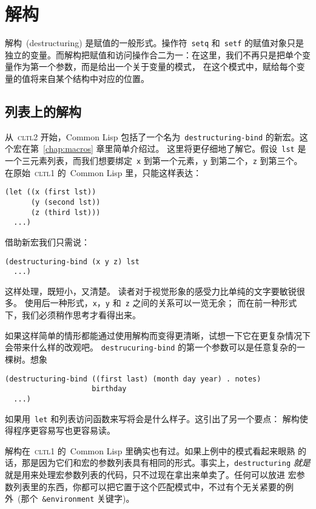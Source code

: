 
\chapter{解构}
\label{chap:destructuring}

解构~(destructuring) 是赋值的一般形式。操作符~\texttt{setq} 和~\texttt{setf} 的赋值对象只是
独立的变量。而解构把赋值和访问操作合二为一：在这里，我们不再只是把单个变量作为第一个参数，而是给出一个关于变量的模式，
在这个模式中，赋给每个变量的值将来自某个结构中对应的位置。

\section{列表上的解构}
\label{destructuring_on_lists}

从~\textsc{cltl}2 开始，Common Lisp 包括了一个名为~\texttt{destructuring-bind}
的新宏。这个宏在第~\ref{chap:macros} 章里简单介绍过。
这里将更仔细地了解它。假设~\texttt{lst} 是一个三元素列表，而我们想要绑定~\texttt{x}
到第一个元素，\texttt{y} 到第二个，\texttt{z} 到第三个。在原始~\textsc{cltl}1
的~Common Lisp 里，只能这样表达：
\begin{lstlisting}
(let ((x (first lst))
      (y (second lst))
      (z (third lst)))
  ...)
\end{lstlisting}
借助新宏我们只需说：
\begin{lstlisting}
(destructuring-bind (x y z) lst
  ...)
\end{lstlisting}
这样处理，既短小，又清楚。
读者对于视觉形象的感受力比单纯的文字要敏锐很多。
使用后一种形式，\texttt{x}，\texttt{y} 和~\texttt{z} 之间的关系可以一览无余；
而在前一种形式下，我们必须稍作思考才看得出来。

如果这样简单的情形都能通过使用解构而变得更清晰，试想一下它在更复杂情况下会带来什么样的改观吧。
\texttt{destrucuring-bind} 的第一个参数可以是任意复杂的一棵树。想象
\begin{lstlisting}
(destructuring-bind ((first last) (month day year) . notes)
                    birthday
  ...)
\end{lstlisting}
如果用~\texttt{let} 和列表访问函数来写将会是什么样子。这引出了另一个要点：
解构使得程序更容易写也更容易读。

解构在~\textsc{cltl}1 的~Common Lisp 里确实也有过。如果上例中的模式看起来眼熟
的话，那是因为它们和宏的参数列表具有相同的形式。事实上，\texttt{destructuring}
\emph{就是} 就是用来处理宏参数列表的代码，只不过现在拿出来单卖了。任何可以放进
宏参数列表里的东西，你都可以把它置于这个匹配模式中，不过有个无关紧要的例外~(那个~\texttt{\&environment}
关键字)。 

